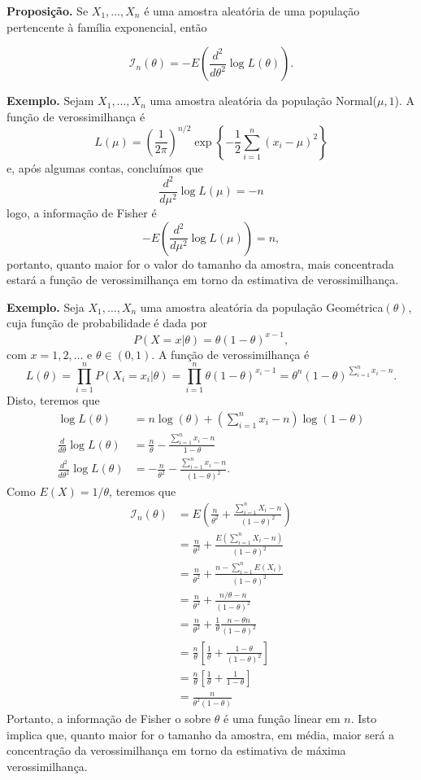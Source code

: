 \documentclass[
  letterpaper,
  DIV=11,
  numbers=noendperiod]{scrartcl}
\begin{document}
\textbf{Proposição.} Se \(X_1,\ldots,X_n\) é uma amostra aleatória de
uma população pertencente à família exponencial, então

\[\mathcal{I}_n(\theta)=-E\left(\frac{d^2}{d\theta^2}\log L(\theta)\right).\]

\textbf{Exemplo.} Sejam \(X_1,\ldots,X_n\) uma amostra aleatória da
população Normal(\(\mu,1\)). A função de verossimilhança é
\[L(\mu)=\left(\frac{1}{2\pi}\right)^{n/2}\exp\left\{-\frac{1}{2}\sum_{i=1}^{n}(x_i-\mu)^2\right\}\]
e, após algumas contas, concluímos que
\[\frac{d^2}{d\mu^2}\log L(\mu)=-n\] logo, a informação de Fisher é
\[-E\left(\frac{d^2}{d\mu^2}\log L(\mu)\right)=n,\] portanto, quanto
maior for o valor do tamanho da amostra, mais concentrada estará a
função de verossimilhança em torno da estimativa de verossimilhança.

\textbf{Exemplo.} Seja \(X_1,\ldots,X_n\) uma amostra aleatória da
população Geométrica\((\theta)\), cuja função de probabilidade é dada
por \[P(X=x|\theta)=\theta(1-\theta)^{x-1},\] com \(x=1,2,\ldots\) e
\(\theta\in(0,1)\). A função de verossimilhan\c{c}a é
\[L(\theta)=\prod_{i=1}^{n}P(X_i=x_i|\theta)=\prod_{i=1}^{n}\theta(1-\theta)^{x_i-1}=\theta^n(1-\theta)^{\sum_{i=1}^{n}x_i-n}.\]
Disto, teremos que \[\begin{align*}
\log L(\theta)&= n\log(\theta) +\left(\sum_{i=1}^{n}x_i-n\right)\log(1-\theta)\\
\frac{d}{d\theta}\log L(\theta)&= \frac{n}{\theta} -\frac{\sum_{i=1}^{n}x_i-n}{1-\theta}\\
\frac{d^2}{d\theta^2}\log L(\theta)&=-\frac{n}{\theta^2}-\frac{\sum_{i=1}^{n}x_i-n}{(1-\theta)^2}.
\end{align*}\] Como \(E(X)=1/\theta\), teremos que \[\begin{align*}
\mathcal{I}_n(\theta)&=E\left(\frac{n}{\theta^2}+\frac{\sum_{i=1}^{n}X_i-n}{(1-\theta)^2}\right)\\
&=\frac{n}{\theta^2}+\frac{E\left(\sum_{i=1}^{n}X_i-n\right)}{(1-\theta)^2}\\
&=\frac{n}{\theta^2}+\frac{n-\sum_{i=1}^{n}E(X_i)}{(1-\theta)^2}\\
&=\frac{n}{\theta^2}+\frac{n/\theta-n}{(1-\theta)^2}\\
&=\frac{n}{\theta^2}+\frac{1}{\theta}\frac{n-\theta n}{(1-\theta)^2}\\
&=\frac{n}{\theta}\left[\frac{1}{\theta}+\frac{1-\theta}{(1-\theta)^2}\right]\\
&=\frac{n}{\theta}\left[\frac{1}{\theta}+\frac{1}{1-\theta}\right]\\
&=\frac{n}{\theta^2(1-\theta)}
\end{align*}\] Portanto, a informação de Fisher o sobre \(\theta\) é uma
função linear em \(n\). Isto implica que, quanto maior for o tamanho da
amostra, em média, maior será a concentra\c{c}ão da verossimilhança em
torno da estimativa de máxima verossimilhança.
\end{document}
